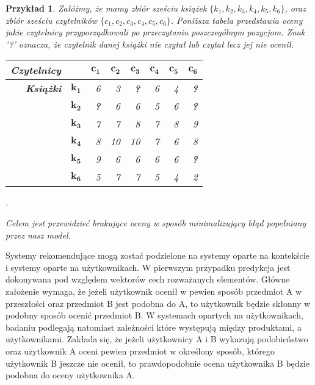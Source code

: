 \documentclass[12pt,a4paper]{report}
\newtheorem{przyklad}{Przykład}[chapter]
\begin{document}
\begin{przyklad}
Załóżmy, że mamy zbiór sześciu książek $\{k_1, k_2, k_3, k_4, k_5, k_6\}$, oraz zbiór sześciu czytelników $\{c_1, c_2, c_3, c_4, c_5, c_6\}$.
Poniższa tabela przedstawia oceny jakie czytelnicy przyporządkowali po przeczytaniu poszczególnym pozycjom. Znak '?' oznacza, że czytelnik danej książki nie czytał lub czytał lecz jej nie ocenił.
\begin{center}
\begin{tabular}{|r|r|r|r|r|r|r|r|} \hline
\textbf{Czytelnicy} & & $\mathbf{c_1}$ & $\mathbf{c_2}$ & $\mathbf{c_3}$ & $\mathbf{c_4}$ & $\mathbf{c_5}$ & $\mathbf{c_6}$ \\
\hline
\hline
\textbf{Książki} &$\mathbf{k_1}$ & 6 & 3 & \textbf{?} & 6 & 4 & \textbf{?} \\
\hline
&$\mathbf{k_2}$ & \textbf{?} & 6 & 6 & 5 & 6 & \textbf{?} \\
\hline
&$\mathbf{k_3}$ & 7 & 7 & 8 & 7 & 8 & 9  \\
\hline
&$\mathbf{k_4}$ & 8 & 10 & 10 & 7 & 6 & 8 \\
\hline
&$\mathbf{k_5}$ & 9 & 6 & 6 & 6 & 6 & \textbf{?} \\
\hline
&$\mathbf{k_6}$ & 5 & 7 & 7 & 5 & 4 & 2 \\
\hline
\end{tabular}.
\end{center}
Celem jest 
przewidzieć brakujące oceny w sposób minimalizujący błąd popełniany przez nasz model.
\end{przyklad}

Systemy rekomendujące mogą zostać podzielone na systemy oparte na kontekście i systemy oparte na użytkownikach. W pierwszym przypadku predykcja jest dokonywana pod względem wektorów cech rozważanych elementów. Główne założenie wymaga, że jeżeli użytkownik ocenił w pewien sposób przedmiot A w przeszłości oraz przedmiot B jest podobna do A, to użytkownik będzie skłonny w podobny sposób ocenić przedmiot B. W systemach opartych na użytkownikach, badaniu podlegają natomiast zależności które występują między produktami, a użytkownikami. Zakłada się, że jeżeli użytkownicy A i B wykazują podobieństwo oraz użytkownik A oceni pewien przedmiot w określony sposób, którego użytkownik B jeszcze nie ocenił, to prawdopodobnie ocena użytkownika B będzie podobna do oceny użytkownika A.
\end{document}
